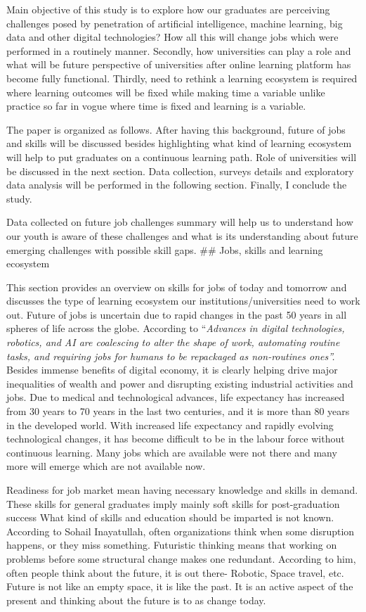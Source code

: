 \documentclass[
]{aft}
\begin{document}
Main objective of this study is to explore how our graduates are
perceiving challenges posed by penetration of artificial intelligence,
machine learning, big data and other digital technologies? How all this
will change jobs which were performed in a routinely manner. Secondly,
how universities can play a role and what will be future perspective of
universities after online learning platform has become fully functional.
Thirdly, need to rethink a learning ecosystem is required where learning
outcomes will be fixed while making time a variable unlike practice so
far in vogue where time is fixed and learning is a variable.

The paper is organized as follows. After having this background, future
of jobs and skills will be discussed besides highlighting what kind of
learning ecosystem will help to put graduates on a continuous learning
path. Role of universities will be discussed in the next section. Data
collection, surveys details and exploratory data analysis will be
performed in the following section. Finally, I conclude the study.

Data collected on future job challenges summary will help us to
understand how our youth is aware of these challenges and what is its
understanding about future emerging challenges with possible skill gaps.
\#\# Jobs, skills and learning ecosystem

This section provides an overview on skills for jobs of today and
tomorrow and discusses the type of learning ecosystem our
institutions/universities need to work out. Future of jobs is uncertain
due to rapid changes in the past 50 years in all spheres of life across
the globe. According to \citet{Coyle2021} ``\emph{Advances in digital
technologies, robotics, and AI are coalescing to alter the shape of
work, automating routine tasks, and requiring jobs for humans to be
repackaged as non-routines ones''.} Besides immense benefits of digital
economy, it is clearly helping drive major inequalities of wealth and
power and disrupting existing industrial activities and jobs. Due to
medical and technological advances, life expectancy has increased from
30 years to 70 years in the last two centuries, and it is more than 80
years in the developed world. With increased life expectancy and rapidly
evolving technological changes, it has become difficult to be in the
labour force without continuous learning. Many jobs which are available
were not there and many more will emerge which are not available now.

Readiness for job market mean having necessary knowledge and skills in
demand. These skills for general graduates imply mainly soft skills for
post-graduation success What kind of skills and education should be
imparted is not known. According to Sohail Inayatullah, often
organizations think when some disruption happens, or they miss
something. Futuristic thinking means that working on problems before
some structural change makes one redundant. According to him, often
people think about the future, it is out there- Robotic, Space travel,
etc. Future is not like an empty space, it is like the past. It is an
active aspect of the present and thinking about the future is to as
change today.
\end{document}

